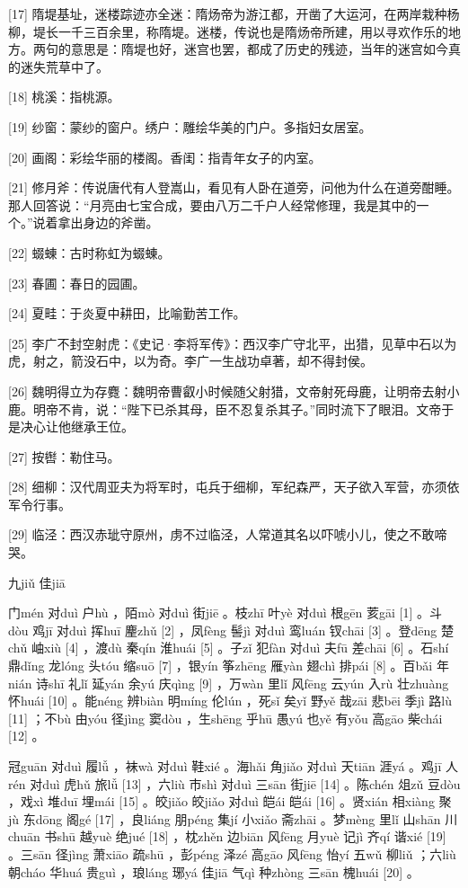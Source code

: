 \documentclass[12pt,UTF8]{ctexbook}
\begin{document}
[17] 隋堤基址，迷楼踪迹亦全迷：隋炀帝为游江都，开凿了大运河，在两岸栽种杨柳，堤长一千三百余里，称隋堤。迷楼，传说也是隋炀帝所建，用以寻欢作乐的地方。两句的意思是：隋堤也好，迷宫也罢，都成了历史的残迹，当年的迷宫如今真的迷失荒草中了。

[18] 桃溪：指桃源。

[19] 纱窗：蒙纱的窗户。绣户：雕绘华美的门户。多指妇女居室。

[20] 画阁：彩绘华丽的楼阁。香闺：指青年女子的内室。

[21] 修月斧：传说唐代有人登嵩山，看见有人卧在道旁，问他为什么在道旁酣睡。那人回答说：“月亮由七宝合成，要由八万二千户人经常修理，我是其中的一个。”说着拿出身边的斧凿。

[22] 蝃蝀：古时称虹为蝃蝀。

[23] 春圃：春日的园圃。

[24] 夏畦：于炎夏中耕田，比喻勤苦工作。

[25] 李广不封空射虎：《史记·李将军传》：西汉李广守北平，出猎，见草中石以为虎，射之，箭没石中，以为奇。李广一生战功卓著，却不得封侯。

[26] 魏明得立为存麑：魏明帝曹叡小时候随父射猎，文帝射死母鹿，让明帝去射小鹿。明帝不肯，说：“陛下已杀其母，臣不忍复杀其子。”同时流下了眼泪。文帝于是决心让他继承王位。

[27] 按辔：勒住马。

[28] 细柳：汉代周亚夫为将军时，屯兵于细柳，军纪森严，天子欲入军营，亦须依军令行事。

[29] 临泾：西汉赤玼守原州，虏不过临泾，人常道其名以吓唬小儿，使之不敢啼哭。





九jiǔ 佳jiā


门mén 对duì 户hù ，陌mò 对duì 街jiē 。枝zhī 叶yè 对duì 根gēn 荄gāi [1] 。斗dòu 鸡jī 对duì 挥huī 麈zhǔ [2] ，凤fèng 髻jì 对duì 鸾luán 钗chāi [3] 。登dēng 楚chǔ 岫xiù [4] ，渡dù 秦qín 淮huái [5] 。子zǐ 犯fàn 对duì 夫fū 差chāi [6] 。石shí 鼎dǐng 龙lóng 头tóu 缩suō [7] ，银yín 筝zhēng 雁yàn 翅chì 排pái [8] 。百bǎi 年nián 诗shī 礼lǐ 延yán 余yú 庆qìng [9] ，万wàn 里lǐ 风fēng 云yún 入rù 壮zhuàng 怀huái [10] 。能néng 辨biàn 明míng 伦lún ，死sǐ 矣yǐ 野yě 哉zāi 悲bēi 季jì 路lù [11] ；不bù 由yóu 径jìng 窦dòu ，生shēng 乎hū 愚yú 也yě 有yǒu 高gāo 柴chái [12] 。

冠guān 对duì 履lǚ ，袜wà 对duì 鞋xié 。海hǎi 角jiǎo 对duì 天tiān 涯yá 。鸡jī 人rén 对duì 虎hǔ 旅lǚ [13] ，六liù 市shì 对duì 三sān 街jiē [14] 。陈chén 俎zǔ 豆dòu ，戏xì 堆duī 埋mái [15] 。皎jiǎo 皎jiǎo 对duì 皑ái 皑ái [16] 。贤xián 相xiàng 聚jù 东dōng 阁gé [17] ，良liáng 朋péng 集jí 小xiǎo 斋zhāi 。梦mèng 里lǐ 山shān 川chuān 书shū 越yuè 绝jué [18] ，枕zhěn 边biān 风fēng 月yuè 记jì 齐qí 谐xié [19] 。三sān 径jìng 萧xiāo 疏shū ，彭péng 泽zé 高gāo 风fēng 怡yí 五wǔ 柳liǔ ；六liù 朝cháo 华huá 贵guì ，琅láng 琊yá 佳jiā 气qì 种zhòng 三sān 槐huái [20] 。
\end{document}
